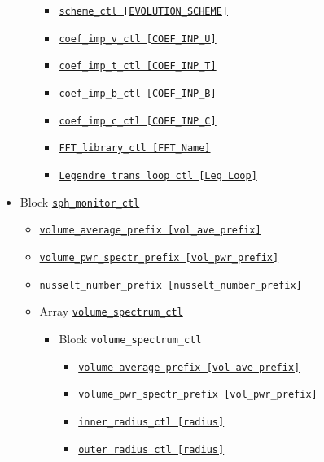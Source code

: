 \begin{itemize}
\begin{itemize}
		\begin{itemize} \label{href_i:time_loop_ctl}
		\item \hyperref[href_t:scheme_ctl]{\tt scheme\_ctl              [EVOLUTION\_SCHEME]}
		\item \hyperref[href_t:coef_imp_v_ctl]{\tt coef\_imp\_v\_ctl    [COEF\_INP\_U]}
		\item \hyperref[href_t:coef_imp_t_ctl]{\tt coef\_imp\_t\_ctl    [COEF\_INP\_T]}
		\item \hyperref[href_t:coef_imp_b_ctl]{\tt coef\_imp\_b\_ctl    [COEF\_INP\_B]}
		\item \hyperref[href_t:coef_imp_c_ctl]{\tt coef\_imp\_c\_ctl    [COEF\_INP\_C]}
		\item \hyperref[href_t:FFT_library_ctl]{\tt FFT\_library\_ctl   [FFT\_Name]}
		\item \hyperref[href_t:Legendre_trans_loop_ctl]
			{\tt Legendre\_trans\_loop\_ctl [Leg\_Loop]}
		\end{itemize}
%
	\end{itemize}
%
\item Block \hyperref[href_t:sph_monitor_ctl]{\tt sph\_monitor\_ctl}
	\begin{itemize} \label{href_i:sph_monitor_ctl}
	\item \hyperref[href_t:volume_average_prefix]
			{\tt volume\_average\_prefix        [vol\_ave\_prefix]}
	\item \hyperref[href_t:volume_pwr_spectr_prefix]
			{\tt volume\_pwr\_spectr\_prefix    [vol\_pwr\_prefix]}
	\item \hyperref[href_t:nusselt_number_prefix]
			{\tt nusselt\_number\_prefix        [nusselt\_number\_prefix]}
%
	\item Array \hyperref[href_t:volume_spectrum_ctl]{\tt volume\_spectrum\_ctl}
		\begin{itemize}
		\item Block \verb|volume_spectrum_ctl|
			\begin{itemize}
			\item \hyperref[href_t:volume_average_prefix]
				{\tt volume\_average\_prefix      [vol\_ave\_prefix]}
			\item \hyperref[href_t:volume_pwr_spectr_prefix]
				{\tt volume\_pwr\_spectr\_prefix  [vol\_pwr\_prefix]}
			\item \hyperref[href_t:inner_radius_ctl]
				{\tt inner\_radius\_ctl           [radius]}
			\item \hyperref[href_t:outer_radius_ctl]
				{\tt outer\_radius\_ctl           [radius]}
			\end{itemize}

\end{itemize}
\end{itemize}
\end{itemize}
